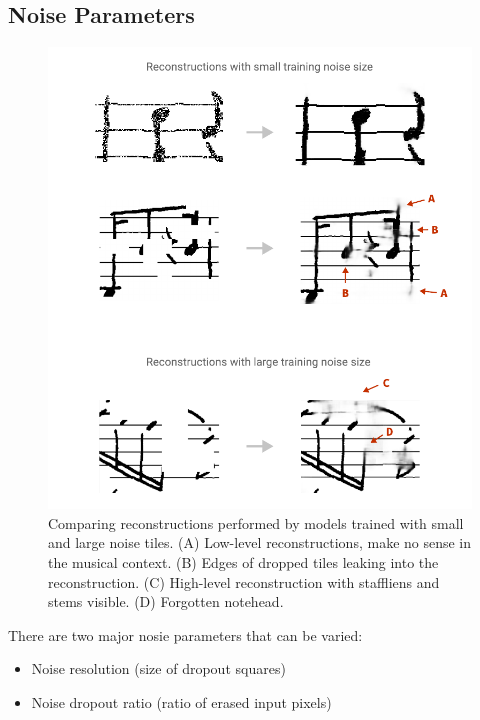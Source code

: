 \subsection{Noise Parameters}
\label{sec:NoiseParameters}

\begin{figure}[p]
    \centering
    \includegraphics[width=140mm]{../../figures/06-noise/noise-size.pdf}
    \caption{Comparing reconstructions performed by models trained with small and large noise tiles. (A) Low-level reconstructions, make no sense in the musical context. (B) Edges of dropped tiles leaking into the reconstruction. (C) High-level reconstruction with staffliens and stems visible. (D) Forgotten notehead.}
    \label{fig:NoiseSize}
\end{figure}

There are two major nosie parameters that can be varied:

\begin{itemize}
    \item Noise resolution (size of dropout squares)
    \item Noise dropout ratio (ratio of erased input pixels)
\end{itemize}

